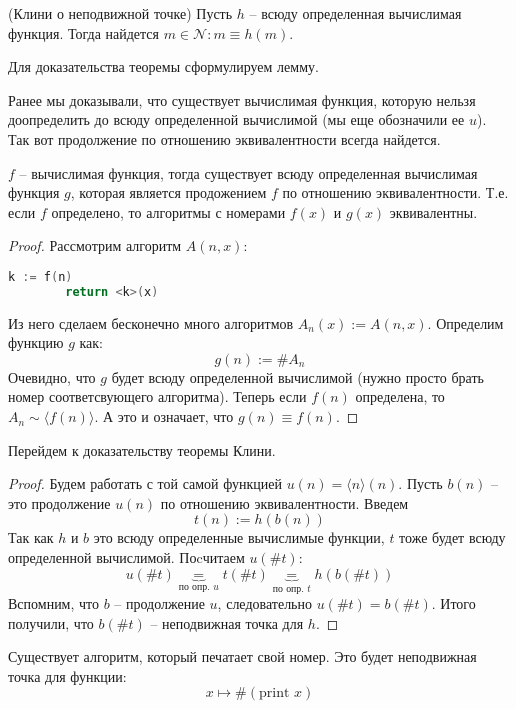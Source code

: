 \begin{theorem} (Клини о неподвижной точке)
    Пусть $h$ -- всюду определенная вычислимая функция. Тогда найдется $m \in \mathcal{N} : m \equiv h(m)$.
\end{theorem}

Для доказательства теоремы сформулируем лемму. 

Ранее мы доказывали, что существует вычислимая функция, которую нельзя доопределить до всюду определенной вычислимой (мы еще обозначили ее $u$). Так вот продолжение по отношению эквивалентности всегда найдется. 

\begin{lemma}
    $f$ -- вычислимая функция, тогда существует всюду определенная вычислимая функция $g$, которая является продожением $f$ по отношению эквивалентности. Т.е. если $f$ определено, то алгоритмы с номерами $f(x)$ и $g(x)$ эквивалентны.
\end{lemma}

\begin{proof}
    Рассмотрим алгоритм $A(n, x)$:  \begin{lstlisting}[language=c++]
        k := f(n)
        return <k>(x)
    \end{lstlisting}
    Из него сделаем бесконечно много алгоритмов $A_n(x) := A(n, x)$. 
    Определим функцию $g$ как: \[ g(n) := \#A_n \]
    Очевидно, что $g$ будет всюду определенной вычислимой (нужно  просто брать номер соответсвующего алгоритма). Теперь если $f(n)$ определена, то $A_n \sim \langle f(n) \rangle$. А это и означает, что $g(n) \equiv f(n)$.
\end{proof}

Перейдем к доказательству теоремы Клини.

\begin{proof}
    Будем работать с той самой функцией $u(n) = \langle n \rangle (n)$. Пусть $b(n)$ -- это продолжение $u(n)$ по отношению эквивалентности. Введем \[ t(n) := h(b(n)) \]
    Так как $h$ и $b$ это всюду определенные вычислимые функции, $t$ тоже будет всюду определенной вычислимой. Поcчитаем $u(\#t)$: \[ u(\#t) \underbrace{=}_{\text{по опр. } u} t(\# t) \underbrace{=}_{\text{по опр. } t} h(b(\#t)) \]
    Вспомним, что $b$ -- продолжение $u$, следовательно $u(\#t) = b(\# t)$. Итого получили, что $b(\#t)$ -- неподвижная точка для $h$. 
\end{proof}

\begin{example}
    Существует алгоритм, который печатает свой номер. Это будет неподвижная точка для функции: \[ x \mapsto \#(\text{print } x) \]
\end{example}

